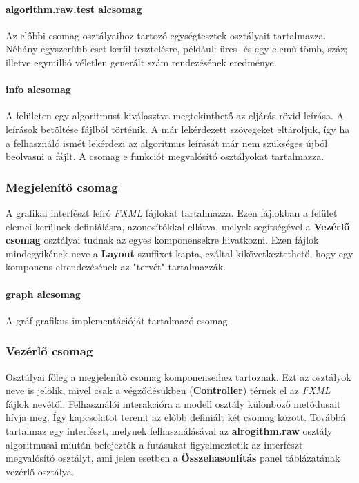 \documentclass{elteikthesis}
\begin{document}
\paragraph{algorithm.raw.test alcsomag}
Az előbbi csomag osztályaihoz tartozó egységtesztek osztályait tartalmazza. Néhány egyszerűbb eset kerül tesztelésre, például: üres- és egy elemű tömb, száz; illetve egymillió véletlen generált szám rendezésének eredménye.
\paragraph{info alcsomag}
A felületen egy algoritmust kiválasztva megtekinthető az eljárás rövid leírása. A leírások betöltése fájlból történik. A már lekérdezett szövegeket eltároljuk, így ha a felhasználó ismét lekérdezi az algoritmus leírását már nem szükséges újból beolvasni a fájlt. A csomag e funkciót megvalósító osztályokat tartalmazza.

\subsubsection{Megjelenítő csomag}
A grafikai interfészt leíró \emph{FXML} fájlokat tartalmazza. Ezen fájlokban a felület elemei kerülnek definiálásra, azonosítókkal ellátva, melyek segítségével a \textbf{Vezérlő csomag} osztályai tudnak az egyes komponensekre hivatkozni. Ezen fájlok mindegyikének neve a \textbf{Layout} szuffixet kapta, ezáltal kikövetkeztethető, hogy egy komponens elrendezésének az "tervét" tartalmazzák.\par
\paragraph{graph alcsomag}
A gráf grafikus implementációját tartalmazó csomag.

\subsubsection{Vezérlő csomag}
Osztályai főleg a megjelenítő csomag komponenseihez tartoznak. Ezt az osztályok neve is jelölik, mivel csak a végződésükben (\textbf{Controller}) térnek el az \emph{FXML} fájlok nevétől. Felhasználói interakcióra a modell osztály különböző metódusait hívja meg. Így kapcsolatot teremt az előbb definiált két csomag között. Továbbá tartalmaz egy interfészt, melynek felhasználásával az \textbf{alrogithm.raw} osztály algoritmusai miután befejezték a futásukat figyelmeztetik az interfészt megvalósító osztályt, ami jelen esetben a \textbf{Összehasonlítás} panel táblázatának vezérlő osztálya.
\end{document}
